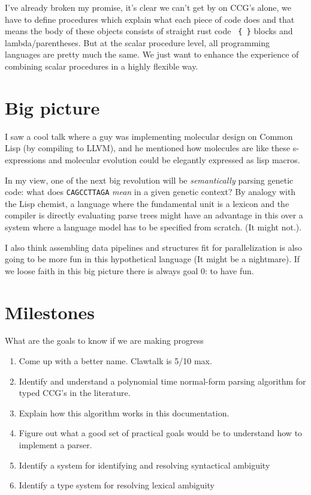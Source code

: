 \documentclass[onecolumn,10pt]{article}
\begin{document}
I've already broken my promise, it's clear we can't get by on CCG's alone, we have to define procedures which explain what each piece of code does and that means the body of these objects consists of straight rust code \texttt{ \{ \}} blocks and lambda/parentheses.  But at the scalar procedure level, all programming languages are pretty much the same. We just want to enhance the experience of combining scalar procedures in a highly flexible way.

\section{Big picture}
I saw a cool talk where a guy was implementing molecular design on Common Lisp (by compiling to LLVM), and he mentioned how molecules are like these s-expressions and molecular evolution could be elegantly expressed as lisp macros.

In my view, one of the next big revolution will be {\em semantically} parsing genetic code: what does \texttt{CAGCCTTAGA} {\em mean} in a given genetic context? By analogy with the Lisp chemist, a language where the fundamental unit is a lexicon and the compiler is directly evaluating parse trees might have an advantage in this  over a system where a language model has to be specified from scratch. (It might not.).

I also think assembling data pipelines and structures fit for parallelization is also going to be more fun in this hypothetical language (It might be a nightmare).  If we loose faith in this big picture there is always goal 0: to have fun.



\section{Milestones}
What are the goals to know if we are making progress
\begin{enumerate}
\item Come up with a better name. Clawtalk is 5/10 max.
\item Identify and understand a polynomial time normal-form parsing algorithm for typed CCG's in the literature.
\item Explain how this algorithm works in this documentation.
\item Figure out what a good set of practical goals would be to understand how to implement a parser.
\item Identify a system for identifying and resolving syntactical ambiguity
\item Identify a type system for resolving lexical ambiguity
\end{enumerate}
\end{document}
